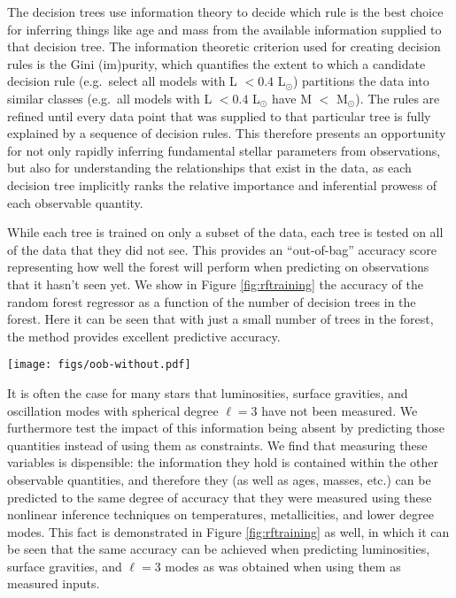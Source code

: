 \documentclass[manuscript]{aastex}
\begin{document}
The decision trees use information theory to decide which rule is the best choice for inferring things like age and mass from the available information supplied to that decision tree. The information theoretic criterion used for creating decision rules is the Gini (im)purity, which quantifies the extent to which a candidate decision rule (e.g.~select all models with L $<0.4$ L$_\odot$) partitions the data into similar classes (e.g.~all models with L $<0.4$ L$_\odot$ have M $<$ M$_\odot$). The rules are refined until every data point that was supplied to that particular tree is fully explained by a sequence of decision rules. This therefore presents an opportunity for not only rapidly inferring fundamental stellar parameters from observations, but also for understanding the relationships that exist in the data, as each decision tree implicitly ranks the relative importance and inferential prowess of each observable quantity. 

\begin{figure*}
    \centering
    \caption{Feature importances \textbf{todo: add plot}}
    \label{fig:importances}
\end{figure*}

While each tree is trained on only a subset of the data, each tree is tested on all of the data that they did not see. This provides an ``out-of-bag'' accuracy score representing how well the forest will perform when predicting on observations that it hasn't seen yet. We show in Figure \ref{fig:rftraining} the accuracy of the random forest regressor as a function of the number of decision trees in the forest. Here it can be seen that with just a small number of trees in the forest, the method provides excellent predictive accuracy. 

\begin{figure*}
    \centering
    \texttt{[image: figs/oob-without.pdf]}
    \caption{Training times and accuracies of a random forest regressor plotted as a function of the number of trees in the forest. \textbf{todo: update plot}}
    \label{fig:rftraining}
\end{figure*}

It is often the case for many stars that luminosities, surface gravities, and oscillation modes with spherical degree $\ell=3$ have not been measured. We furthermore test the impact of this information being absent by predicting those quantities instead of using them as constraints. We find that measuring these variables is dispensible: the information they hold is contained within the other observable quantities, and therefore they (as well as ages, masses, etc.) can be predicted to the same degree of accuracy that they were measured using these nonlinear inference techniques on temperatures, metallicities, and lower degree modes. This fact is demonstrated in Figure \ref{fig:rftraining} as well, in which it can be seen that the same accuracy can be achieved when predicting luminosities, surface gravities, and $\ell=3$ modes as was obtained when using them as measured inputs. 
\end{document}
